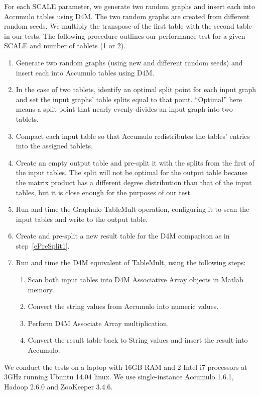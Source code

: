 For each SCALE parameter, we generate two random graphs and insert each into Accumulo tables using D4M.
The two random graphs are created from different random seeds.
We multiply the transpose of the first table with the second table in our tests.
The following procedure outlines our performance test for a given SCALE and number of tablets (1 or 2).
\begin{enumerate}
\item Generate two random graphs (using new and different random seeds) 
and insert each into Accumulo tables using D4M.
\item In the case of two tablets, identify an optimal split point for each input graph
and set the input graphs' table splits equal to that point.
``Optimal'' here means a split point that nearly evenly divides an input graph into two tablets.
\item Compact each input table so that Accumulo redistributes the tables' entries into the assigned tablets.
\item \label{ePreSplit1} Create an empty output table and pre-split it with the splits from the first of the input tables.
The split will not be optimal for the output table because the matrix product has a different degree distribution 
than that of the input tables, but it is close enough for the purposes of our test.
\item Run and time the Graphulo TableMult operation, configuring it to scan the input tables and write to the 
output table.
\item Create and pre-split a new result table for the D4M comparison as in step~\ref{ePreSplit1}.
\item Run and time the D4M equivalent of TableMult, using the following steps:
 \begin{enumerate}
 \item Scan both input tables into D4M Associative Array objects in Matlab memory.
 \item Convert the string values from Accumulo into numeric values.
 \item Perform D4M Associate Array multiplication.
 \item Convert the result table back to String values and insert the result into Accumulo.
 \end{enumerate}
\end{enumerate}

We conduct the tests on a laptop with 16GB RAM and 2 Intel i7 processors at 3GHz
running Ubuntu 14.04 linux. We use single-instance Accumulo 1.6.1, Hadoop 2.6.0 and ZooKeeper 3.4.6.

